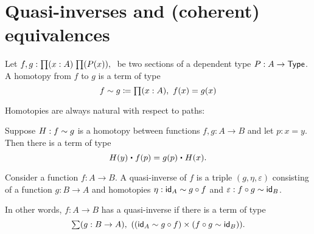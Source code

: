 \section{Quasi-inverses and (coherent) equivalences}
\label{sec:basics-equivalences}

\begin{defn}
Let $f,g:\prd{x:A}{P(x)}$ be two sections of a dependent type $P:A\to\type$. A
homotopy from $f$ to $g$ is a term of type
\begin{equation*}
f\htpy g\defeq \prd{x:A}f(x)=g(x)
\end{equation*}
\end{defn}

Homotopies are always natural with respect to paths:

\begin{lem}\label{lem:htpy_natural}
Suppose $H:f\htpy g$ is a homotopy between functions $f,g:A\to B$
 and let $p:x=y$. Then there is a term of type
 \begin{equation*}
 H(y)\ct\ap{f}{p}=\ap{g}{p}\ct H(x).
 \end{equation*}
\end{lem}

\begin{defn}
Consider a function $f:A\to B$. A quasi-inverse of $f$ is a triple 
$(g,\eta,\varepsilon)$ consisting of a function $g:B\to A$ and homotopies
$\eta:\idfunc[A]\htpy g\circ f$ and $\varepsilon:f\circ g\htpy \idfunc[B]$.
\end{defn}

\begin{rm}
In other words, $f:A\to B$ has a quasi-inverse if there is a term of type
\begin{equation*}
\sm{g:B\to A}((\idfunc[A]\htpy g\circ f)\times(f\circ g\htpy\idfunc[B])).
\end{equation*}
\end{rm}


